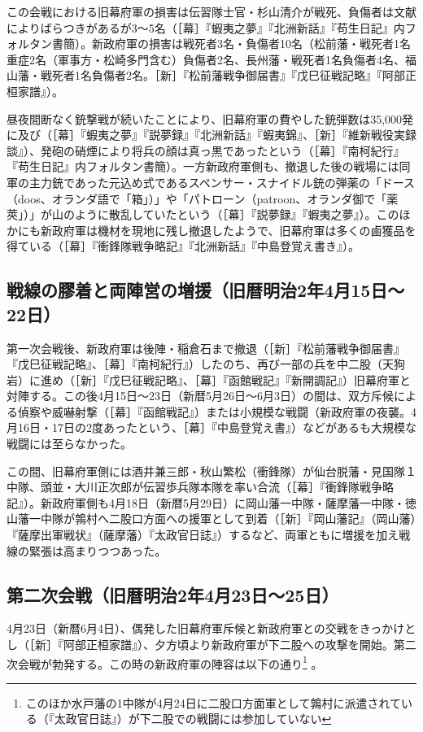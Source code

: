 \documentclass[11pt,report]{jsarticle}
\begin{document}
この会戦における旧幕府軍の損害は伝習隊士官・杉山清介が戦死、負傷者は文献によりばらつきがあるが3～5名（［幕］『蝦夷之夢』『北洲新話』『苟生日記』内フォルタン書簡）。新政府軍の損害は戦死者3名・負傷者10名（松前藩・戦死者1名重症2名（軍事方・松崎多門含む）負傷者2名、長州藩・戦死者1名負傷者4名、福山藩・戦死者1名負傷者2名。［新］『松前藩戦争御届書』『戊巳征戦記略』『阿部正桓家譜』）。

昼夜間断なく銃撃戦が続いたことにより、旧幕府軍の費やした銃弾数は35,000発に及び（［幕］『蝦夷之夢』『説夢録』『北洲新話』『蝦夷錦』、［新］『維新戦役実録談』）、発砲の硝煙により将兵の顔は真っ黒であったという（［幕］『南柯紀行』『苟生日記』内フォルタン書簡）。一方新政府軍側も、撤退した後の戦場には同軍の主力銃であった元込め式であるスペンサー・スナイドル銃の弾薬の「ドース（doos、オランダ語で「箱」）」や「パトローン（patroon、オランダ御で「薬莢」）」が山のように散乱していたという（［幕］『説夢録』『蝦夷之夢』）。このほかにも新政府軍は機材を現地に残し撤退したようで、旧幕府軍は多くの鹵獲品を得ている（［幕］『衝鋒隊戦争略記』『北洲新話』『中島登覚え書き』）。

\subsection{戦線の膠着と両陣営の増援（旧暦明治2年4月15日～22日）}
第一次会戦後、新政府軍は後陣・稲倉石まで撤退（［新］『松前藩戦争御届書』『戊巳征戦記略』、［幕］『南柯紀行』）したのち、再び一部の兵を中二股（天狗岩）に進め（［新］『戊巳征戦記略』、［幕］『函館戦記』『新開調記』）旧幕府軍と対陣する。この後4月15日～23日（新暦5月26日～6月3日）の間は、双方斥候による偵察や威嚇射撃（［幕］『函館戦記』）または小規模な戦闘（新政府軍の夜襲。4月16日・17日の2度あったという、［幕］『中島登覚え書』）などがあるも大規模な戦闘には至らなかった。

この間、旧幕府軍側には酒井兼三郎・秋山繁松（衝鋒隊）が仙台脱藩・見国隊１中隊、頭並・大川正次郎が伝習歩兵隊本隊を率い合流（［幕］『衝鋒隊戦争略記』）。新政府軍側も4月18日（新暦5月29日）に岡山藩一中隊・薩摩藩一中隊・徳山藩一中隊が鶉村へ二股口方面への援軍として到着（［新］『岡山藩記』（岡山藩）『薩摩出軍戦状』（薩摩藩）『太政官日誌』）するなど、両軍ともに増援を加え戦線の緊張は高まりつつあった。

\subsection{第二次会戦（旧暦明治2年4月23日～25日）}
4月23日（新暦6月4日）、偶発した旧幕府軍斥候と新政府軍との交戦をきっかけとし（［新］『阿部正桓家譜』）、夕方頃より新政府軍が下二股への攻撃を開始。第二次会戦が勃発する。この時の新政府軍の陣容は以下の通り\footnote{
このほか水戸藩の1中隊が4月24日に二股口方面軍として鶉村に派遣されている（『太政官日誌』）が下二股での戦闘には参加していない
}
。
\end{document}
